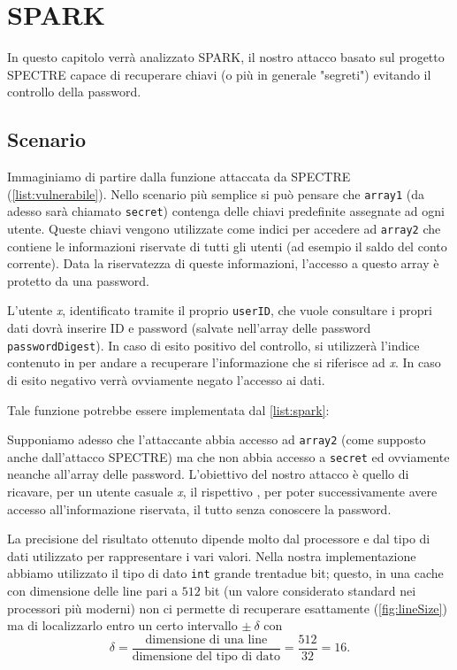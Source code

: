 \chapter{SPARK}
	In questo capitolo verrà analizzato \ac{SPARK}, il nostro attacco basato sul progetto SPECTRE capace di recuperare chiavi (o più in generale "segreti") evitando il controllo della password.
	
	\section{Scenario}
		Immaginiamo di partire dalla funzione attaccata da SPECTRE (\cref{list:vulnerabile}). Nello scenario più semplice si può pensare che \texttt{array1} (da adesso sarà chiamato \texttt{secret}) contenga delle chiavi predefinite assegnate ad ogni utente. Queste chiavi vengono utilizzate come indici  per accedere ad \texttt{array2} che contiene le informazioni riservate di tutti gli utenti (ad esempio il saldo del conto corrente). Data la riservatezza di queste informazioni, l'accesso a questo array è protetto da una password. 
		
		L'utente \emph{x}, identificato tramite il proprio \texttt{userID}, che vuole consultare i propri dati dovrà inserire ID e password (salvate nell'array delle password \texttt{passwordDigest}). In caso di esito positivo del controllo, si utilizzerà l'indice contenuto in  per andare a recuperare l'informazione che si riferisce ad \emph{x}. In caso di esito negativo verrà ovviamente negato l'accesso ai dati.
		
		Tale funzione potrebbe essere implementata dal \cref{list:spark}:
		
		Supponiamo adesso che l'attaccante abbia accesso ad \texttt{array2} (come supposto anche dall'attacco SPECTRE) ma che non abbia accesso a \texttt{secret} ed ovviamente neanche all'array delle password. L'obiettivo del nostro attacco è quello di ricavare, per un utente casuale \emph{x}, il rispettivo , per poter successivamente avere accesso all'informazione riservata, il tutto senza conoscere la password.
		
		La precisione del risultato ottenuto dipende molto dal processore e dal tipo di dati utilizzato per rappresentare i vari valori. Nella nostra implementazione abbiamo utilizzato il tipo di dato \texttt{int} grande trentadue bit; questo, in una cache con dimensione delle line pari a $512$ bit (un valore considerato standard nei processori più moderni) non ci permette di recuperare esattamente  (\cref{fig:lineSize}) ma di localizzarlo entro un certo intervallo  $\pm \ \delta$ con $$\delta = \frac{\text{dimensione di una line}}{\text{dimensione del tipo di dato}} = \frac{512}{32} = 16.$$
		
